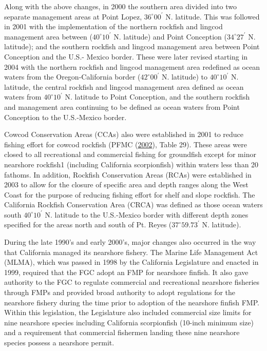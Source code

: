 \documentclass[12pt,]{article}
\begin{document}
Along with the above changes, in 2000 the southern area divided into two
separate management areas at Point Lopez, \(36^\circ 00^\prime\) N.
latitude. This was followed in 2001 with the implementation of the
northern rockfish and lingcod management area between
(\(40^\circ 10^\prime\) N. latitude) and Point Conception
(\(34^\circ 27^\prime\) N. latitude); and the southern rockfish and
lingcod management area between Point Conception and the U.S.- Mexico
border. These were later revised starting in 2004 with the northern
rockfish and lingcod management area redefined as ocean waters from the
Oregon-California border (\(42^\circ 00^\prime\) N. latitude) to
\(40^\circ 10^\prime\) N. latitude, the central rockfish and lingcod
management area defined as ocean waters from \(40^\circ 10^\prime\) N.
latitude to Point Conception, and the southern rockfish and management
area continuing to be defined as ocean waters from Point Conception to
the U.S.-Mexico border.

Cowcod Conservation Areas (CCAs) also were established in 2001 to reduce
fishing effort for cowcod rockfish (PFMC
(\protect\hyperlink{ref-PFMC2002}{2002}), Table 29). These areas were
closed to all recreational and commercial fishing for groundfish except
for minor nearshore rockfish1 (including California scorpionfish) within
waters less than 20 fathoms. In addition, Rockfish Conservation Areas
(RCAs) were established in 2003 to allow for the closure of specific
area and depth ranges along the West Coast for the purpose of reducing
fishing effort for shelf and slope rockfish. The California Rockfish
Conservation Area (CRCA) was defined as those ocean waters south
\(40^\circ 10^\prime\) N. latitude to the U.S.-Mexico border with
different depth zones specified for the areas north and south of Pt.
Reyes (\(37^\circ 59.73^\prime\) N. latitude).

During the late 1990's and early 2000's, major changes also occurred in
the way that California managed its nearshore fishery. The Marine Life
Management Act (MLMA), which was passed in 1998 by the California
Legislature and enacted in 1999, required that the FGC adopt an FMP for
nearshore finfish. It also gave authority to the FGC to regulate
commercial and recreational nearshore fisheries through FMPs and
provided broad authority to adopt regulations for the nearshore fishery
during the time prior to adoption of the nearshore finfish FMP. Within
this legislation, the Legislature also included commercial size limits
for nine nearshore species including California scorpionfish (10-inch
minimum size) and a requirement that commercial fishermen landing these
nine nearshore species possess a nearshore permit.
\end{document}
